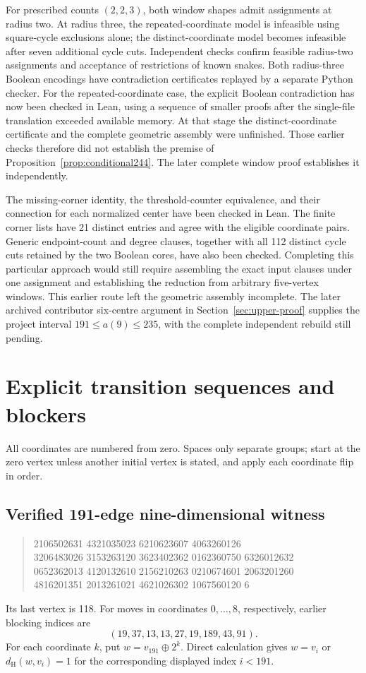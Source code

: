 \documentclass[11pt,a4paper]{article}
\theoremstyle{definition}
\theoremstyle{remark}
\newcommand{\Ham}{d_{\mathrm H}}
\begin{document}
For prescribed counts $(2,2,3)$, both window shapes admit assignments at radius two. At radius three, the repeated-coordinate model is infeasible using square-cycle exclusions alone; the distinct-coordinate model becomes infeasible after seven additional cycle cuts. Independent checks confirm feasible radius-two assignments and acceptance of restrictions of known snakes. Both radius-three Boolean encodings have contradiction certificates replayed by a separate Python checker. For the repeated-coordinate case, the explicit Boolean contradiction has now been checked in Lean, using a sequence of smaller proofs after the single-file translation exceeded available memory. At that stage the distinct-coordinate certificate and the complete geometric assembly were unfinished. Those earlier checks therefore did not establish the premise of Proposition~\ref{prop:conditional244}. The later complete window proof establishes it independently.

The missing-corner identity, the threshold-counter equivalence, and their connection for each normalized center have been checked in Lean. The finite corner lists have 21 distinct entries and agree with the eligible coordinate pairs. Generic endpoint-count and degree clauses, together with all 112 distinct cycle cuts retained by the two Boolean cores, have also been checked. Completing this particular approach would still require assembling the exact input clauses under one assignment and establishing the reduction from arbitrary five-vertex windows. This earlier route left the geometric assembly incomplete. The later archived contributor six-centre argument in Section~\ref{sec:upper-proof} supplies the project interval $191\le a(9)\le235$, with the complete independent rebuild still pending.

\section{Explicit transition sequences and blockers}\label{app:witness}
All coordinates are numbered from zero. Spaces only separate groups; start at the zero vertex unless another initial vertex is stated, and apply each coordinate flip in order.
\subsection{Verified 191-edge nine-dimensional witness}
\begin{quote}\small{} 2106502631 4321035023 6210623607 4063260126\\
3206483026 3153263120 3623402362 0162360750 6326012632\\
0652362013 4120132610 2156210263 0210674601 2063201260\\
4816201351 2013261021 4621026302 1067560120 6
\end{quote}
Its last vertex is 118. For moves in coordinates $0,\ldots,8$, respectively, earlier blocking indices are
\[
(19,37,13,13,27,19,189,43,91).
\]
For each coordinate $k$, put $w=v_{191}\mathbin{\oplus}2^k$. Direct calculation gives $w=v_i$ or $\Ham(w,v_i)=1$ for the corresponding displayed index $i<191$.
\end{document}
